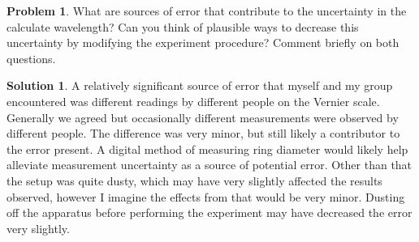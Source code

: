 \documentclass[10pt]{article}
\theoremstyle{definition}
\newtheorem{problem}{Problem}
\newtheorem{soln}{Solution}
\begin{document}
\begin{problem}
What are sources of error that contribute to the uncertainty in the calculate wavelength? Can you think of plausible ways to decrease this uncertainty by modifying the experiment procedure?
Comment briefly on both questions.
\end{problem}
\begin{soln}
  A relatively significant source of error that myself and my group encountered was different readings by different people on the Vernier scale. Generally we agreed
  but occasionally different measurements were observed by different people. The difference was very minor, but still likely a contributor to the error present. A digital method of measuring ring
  diameter would likely help alleviate measurement uncertainty as a source of potential error. Other than that the setup was quite dusty, which may have very slightly affected the results observed,
  however I imagine the effects from that would be very minor. Dusting off the apparatus before performing the experiment may have decreased the error very slightly.
\end{soln}
\end{document}
